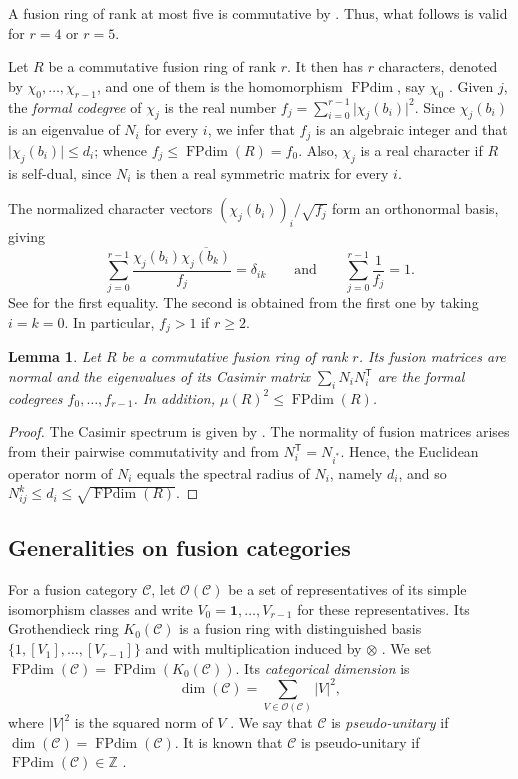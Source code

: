 \documentclass[11pt]{amsart}
\newtheorem{lemma}[theorem]{Lemma}
\theoremstyle{definition}
\DeclareMathOperator{\FPdim}{FPdim}
\newcommand{\Z}{\mathbb Z}
\newcommand{\one}{\mathbf1}
\numberwithin{equation}{section}
\begin{document}
A fusion ring of rank at most five is commutative by \cite[Proposition~9.2]{IntegralRings}. 
Thus, what follows is valid for $r=4$ or $r=5$. 

Let $R$ be a commutative fusion ring of rank $r$.
It then has $r$ characters, denoted by $\chi_0,\dots, \chi_{r-1}$, and one of them is the homomorphism $\FPdim$, say $\chi_0$ \cite[Proposition 3.3.6 (3)]{EGNO}.
Given $j$, the \textit{formal codegree} of $\chi_j$ is the real number $f_j=\sum_{i=0}^{r-1} \vert \chi_j(b_i)\vert^2$. 
Since $\chi_j(b_i)$ is an eigenvalue of $N_i$ for every $i$, we infer that $f_j$ is an algebraic integer and that $\vert \chi_j(b_i)\vert \leq d_i$; whence $f_j \leq \FPdim(R)= f_0$. 
Also, $\chi_j$ is a real character if $R$ is self-dual, since $N_i$ is then a real symmetric matrix for every $i$. 

The normalized character vectors
$(\chi_j(b_i))_i/\sqrt{f_j}$ form an orthonormal basis, giving
\begin{equation}\label{eq:orthogonality}
 \sum_{j=0}^{r-1}\frac{\chi_j(b_i)\overline{\chi_j(b_k)}}{f_j}
 =\delta_{ik} \qquad  \text{and} \qquad \sum_{j=0}^{r-1} \frac{1}{f_j}=1.
\end{equation}
See \cite[Theorem 2.4]{LPR2} for the first equality. 
The second is obtained from the first one by taking $i=k=0$. In particular, $f_j>1$ if $r\geq2$. 

\begin{lemma}\label{lem:commutative}
Let $R$ be a commutative fusion ring of rank $r$. Its fusion matrices are
normal and the eigenvalues of its \textnormal{Casimir matrix} $\sum_iN_iN_i^{\mathsf T}$ are the formal codegrees $f_0,\dots, f_{r-1}$.
In addition, $\mu(R)^2\leq\FPdim(R)$.
\end{lemma}
\begin{proof}
The Casimir spectrum is given by
\cite[Example~2.4 and Lemma~2.6]{OstrikCodegrees}.
The normality of fusion matrices arises from their pairwise commutativity and from $N_i^{\mathsf T}=N_{i^*}$. 
Hence, the Euclidean operator norm of $N_i$ equals the spectral radius of $N_i$, namely $d_i$, and so $N_{ij}^k\leq d_i\leq\sqrt{\FPdim(R)}$.
\end{proof}

\subsection{Generalities on fusion categories} \label{sub-sec2.2}
For a fusion category $\mathcal C$, let $\mathcal O(\mathcal C)$ be a
set of representatives of its simple isomorphism classes and write
$V_0=\one,\ldots,V_{r-1}$ for these representatives.
Its Grothendieck ring $K_0(\mathcal C)$ is a fusion ring with distinguished basis
$\{1, [V_1],\dots, [V_{r-1}]\}$ and with multiplication induced by $\otimes$
\cite[Proposition~4.9.1]{EGNO}. We set
$\FPdim(\mathcal C)=\FPdim(K_0(\mathcal C))$.
Its \textit{categorical dimension} is
\[
 \dim(\mathcal C)=\sum_{V\in\mathcal O(\mathcal C)}|V|^2,
\]
where $|V|^2$ is the squared norm of $V$ \cite[Definition~7.21.3]{EGNO}.
We say that $\mathcal{C}$ is \emph{pseudo-unitary} if
$\dim(\mathcal C)=\FPdim(\mathcal C)$.
It is known that $\mathcal{C}$ is pseudo-unitary if $\FPdim(\mathcal C)\in\Z$ \cite[Proposition~9.6.5]{EGNO}.
\end{document}
